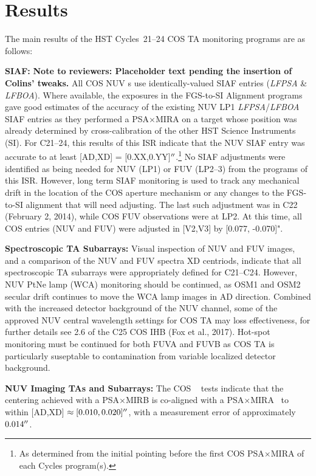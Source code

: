 \section{Results}\label{sec:results}
The main results of the HST Cycles~21--24 COS TA monitoring programs are as follows:
\begin{description}
\item{\bf SIAF:}{
	{\bf Note to reviewers: Placeholder text pending the insertion of Colins' tweaks.}
	All COS NUV s use identically-valued SIAF entries ({\it LFPSA} \& {\it LFBOA}).
	Where available, the exposures in the FGS-to-SI Alignment programs gave good estimates of the accuracy of the existing NUV LP1 {\it LFPSA}/{\it LFBOA} SIAF entries
	as they performed a PSA$\times$MIRA  on a target whose position was already determined by cross-calibration of the other HST Science Instruments (SI).
	For C21--24, this results of this ISR indicate that the NUV SIAF entry was accurate to at least [AD,XD] = [0.XX,0.YY]$\hbox{$^{\prime\prime}$}$.\footnote{As determined from the initial pointing before the first COS PSA$\times$MIRA  of each Cycles program(s).}
	No SIAF adjustments were identified as being needed for NUV (LP1) or FUV (LP2--3) from the programs of this ISR.
	However, long term SIAF monitoring is used to track any mechanical drift in the location of the COS aperture mechanism or any changes to the FGS-to-SI alignment that will need adjusting.
	The last such adjustment was in C22 (February 2, 2014), while COS FUV observations were at LP2. At this time, all COS entries (NUV and FUV) were adjusted in [V2,V3] by [0.077, -0.070]".
}
\item{\bf Spectroscopic TA Subarrays:} Visual inspection of NUV and FUV images, and a comparison of the NUV and FUV spectra XD centriods, indicate that all spectroscopic TA subarrays were appropriately defined for C21--C24.
However, NUV PtNe lamp (WCA) monitoring should be continued, as OSM1 and OSM2 secular drift continues to move the WCA lamp images in AD direction. Combined with the increased
detector background of the NUV channel, some of the approved NUV central wavelength settings for COS TA
may loss effectiveness, for further details see 2.6 of the C25 COS IHB (Fox et al., 2017).
Hot-spot monitoring must be continued for both FUVA and FUVB as COS TA is particularly
suseptable to contamination from variable localized detector background.
\item{\bf NUV Imaging TAs and Subarrays:}
	The COS ~ tests indicate that the centering achieved with a PSA$\times$MIRB  is co-aligned with a PSA$\times$MIRA ~to within [AD,XD] $\approx [0.010,0.020]\hbox{$^{\prime\prime}$}$, with a measurement error of approximately $0.014\hbox{$^{\prime\prime}$}$.

\end{description}
